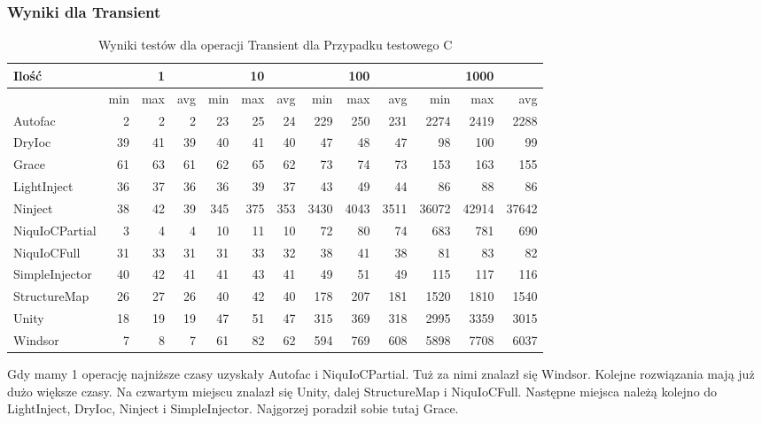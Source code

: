 \documentclass[12pt]{article}
\begin{document}
\subsubsection{Wyniki dla Transient}
\begin{table}[H]
\captionsetup{belowskip=0pt,aboveskip=0pt}
\begin{center}
\begin{small}
	\begin{tabular}{ | l | r r r | r r r | r r r | r r r | }
    		\hline
Ilość & & 1 & & & 10 & & & 100 & & & 1000 & \\ \hline
 & min & max & avg & min & max & avg & min & max & avg & min & max & avg \\ \hline
Autofac & 2 & 2 & 2 & 23 & 25 & 24 & 229 & 250 & 231 & 2274 & 2419 & 2288 \\ \hline
DryIoc & 39 & 41 & 39 & 40 & 41 & 40 & 47 & 48 & 47 & 98 & 100 & 99 \\ \hline
Grace & 61 & 63 & 61 & 62 & 65 & 62 & 73 & 74 & 73 & 153 & 163 & 155 \\ \hline
LightInject & 36 & 37 & 36 & 36 & 39 & 37 & 43 & 49 & 44 & 86 & 88 & 86 \\ \hline
Ninject & 38 & 42 & 39 & 345 & 375 & 353 & 3430 & 4043 & 3511 & 36072 & 42914 & 37642 \\ \hline
NiquIoCPartial & 3 & 4 & 4 & 10 & 11 & 10 & 72 & 80 & 74 & 683 & 781 & 690 \\ \hline
NiquIoCFull & 31 & 33 & 31 & 31 & 33 & 32 & 38 & 41 & 38 & 81 & 83 & 82 \\ \hline
SimpleInjector & 40 & 42 & 41 & 41 & 43 & 41 & 49 & 51 & 49 & 115 & 117 & 116 \\ \hline
StructureMap & 26 & 27 & 26 & 40 & 42 & 40 & 178 & 207 & 181 & 1520 & 1810 & 1540 \\ \hline
Unity & 18 & 19 & 19 & 47 & 51 & 47 & 315 & 369 & 318 & 2995 & 3359 & 3015 \\ \hline
Windsor & 7 & 8 & 7 & 61 & 82 & 62 & 594 & 769 & 608 & 5898 & 7708 & 6037 \\ \hline
  	\end{tabular}
\end{small}
\end{center}
\caption{Wyniki testów dla operacji Transient dla Przypadku testowego C}
\label{TestCaseC_Transient}
\end{table}
Gdy mamy 1 operację najniższe czasy uzyskały Autofac i NiquIoCPartial. Tuż za nimi znalazł się Windsor. Kolejne rozwiązania mają już dużo większe czasy. Na czwartym miejscu znalazł się Unity, dalej StructureMap i NiquIoCFull. Następne miejsca należą kolejno do LightInject, DryIoc, Ninject i SimpleInjector. Najgorzej poradził sobie tutaj Grace.\\
\end{document}
